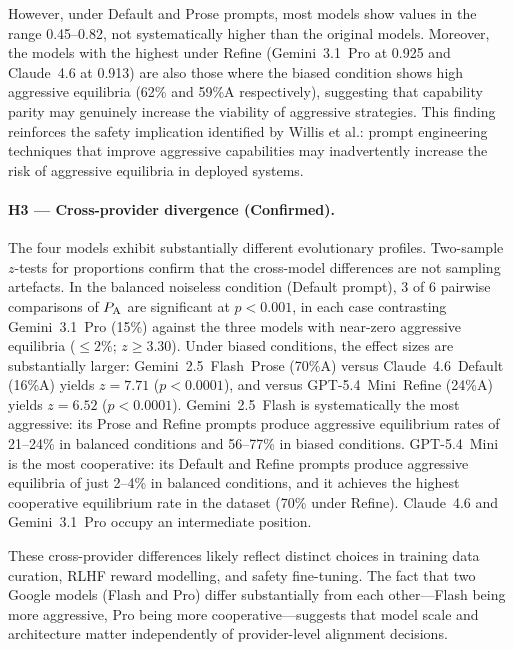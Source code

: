 However, under Default and Prose prompts, most models show \ICD values in the
range 0.45--0.82, not systematically higher than the original models. Moreover,
the models with the highest \ICD under Refine (Gemini~3.1~Pro at 0.925 and
Claude~4.6 at 0.913) are also those where the biased condition shows high
aggressive equilibria (62\% and 59\%A respectively),
suggesting that capability parity may genuinely increase the viability of
aggressive strategies. This finding reinforces the safety implication identified
by Willis et al.: prompt engineering techniques that improve aggressive
capabilities may inadvertently increase the risk of aggressive equilibria in deployed systems.

\paragraph{H3 — Cross-provider divergence (\textcolor{green!60!black}{Confirmed}).}
The four models exhibit substantially different evolutionary profiles.
Two-sample $z$-tests for proportions confirm that the cross-model differences
are not sampling artefacts. In the balanced noiseless condition (Default prompt),
3 of 6 pairwise comparisons of $P_{\mathrm{A}}$ are significant at $p < 0.001$, in each case
contrasting Gemini~3.1~Pro (15\%) against the three models with near-zero aggressive
equilibria ($\leq 2\%$; $z \geq 3.30$). Under biased conditions, the effect sizes
are substantially larger: Gemini~2.5~Flash~Prose (70\%A) versus
Claude~4.6~Default (16\%A) yields $z = 7.71$ ($p < 0.0001$), and versus
GPT-5.4~Mini~Refine (24\%A) yields $z = 6.52$ ($p < 0.0001$).
Gemini~2.5~Flash is systematically the
most aggressive: its Prose and Refine prompts produce aggressive equilibrium
rates of 21--24\% in balanced conditions and 56--77\% in biased conditions.
GPT-5.4~Mini is the most cooperative: its Default and Refine prompts produce
aggressive equilibria of just 2--4\% in balanced conditions, and it achieves
the highest cooperative equilibrium rate in the dataset (70\% under Refine).
Claude~4.6 and Gemini~3.1~Pro occupy an intermediate position.

These cross-provider differences likely reflect distinct choices in training
data curation, RLHF reward modelling, and safety fine-tuning. The fact that
two Google models (Flash and Pro) differ substantially from each other---Flash
being more aggressive, Pro being more cooperative---suggests that model scale
and architecture matter independently of provider-level alignment decisions.

